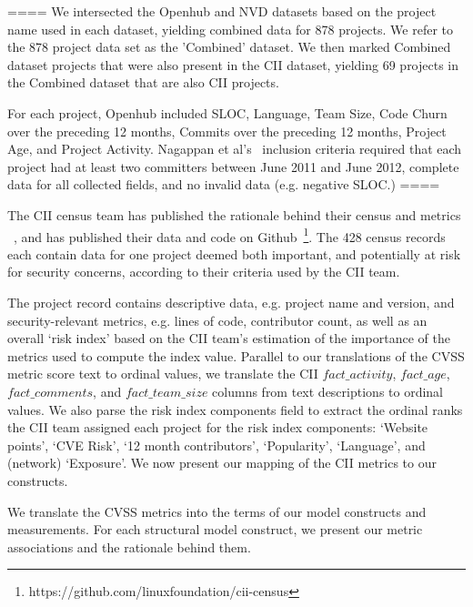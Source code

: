 ====
We intersected the Openhub and NVD datasets based on the project name used in each dataset, yielding combined data for 878 projects. We refer to the 878 project data set as the 'Combined' dataset. We then marked Combined dataset projects that were also present in the CII dataset, yielding 69 projects in the Combined dataset that are also CII projects.

For each project, Openhub included SLOC, Language, Team Size, Code Churn over the preceding 12 months, Commits over the preceding 12 months, Project Age, and Project Activity. Nagappan et al's~\cite{nagappan2013diversity} inclusion criteria required that each project had at least two committers between June 2011 and June 2012, complete data for all collected fields, and no invalid data (e.g. negative SLOC.)
====


The CII census team has published the rationale behind their census and metrics ~\cite{wheeler2015open}, and has published their data and code on Github~\footnote{https://github.com/linuxfoundation/cii-census}. The 428 census records each contain data for one project deemed both important, and potentially at risk for security concerns, according to their criteria used by the CII team.

The project record contains descriptive data, e.g. project name and version, and security-relevant metrics, e.g. lines of code, contributor count, as well as an overall `risk index' based on the CII team's estimation of the importance of the metrics used to compute the index value.  Parallel to our translations of the CVSS metric score text to ordinal values, we translate the CII $fact\_activity$, $fact\_age$, $fact\_comments$, and $fact\_team\_size$ columns from text descriptions to ordinal values. We also parse the risk index components field to extract the ordinal ranks the CII team assigned each project for the risk index components: `Website points', `CVE Risk', `12 month contributors', `Popularity', `Language', and (network) `Exposure'. We now present our mapping of the CII metrics to our constructs.



 We translate the CVSS metrics into the terms of our model constructs and measurements. For each structural model construct, we present our metric associations and the rationale behind them.
 
